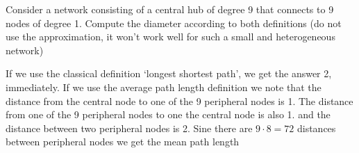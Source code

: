 
Consider a network consisting of a central hub of degree 9 that connects to 9 nodes of degree 1. Compute the diameter according to both definitions (do not use the approximation, it won't work well for such a small and heterogeneous network)  

\solution
If we use the classical definition `longest shortest path', we get the answer 2, immediately. If we use the average path length definition we note that the distance from the central node to one of the 9 peripheral nodes is 1. The distance from one of the 9 peripheral nodes to one the central node is also 1. and the distance between two peripheral nodes is 2. Sine there are $9\cdot8=72$ distances between peripheral nodes we get the mean path length
